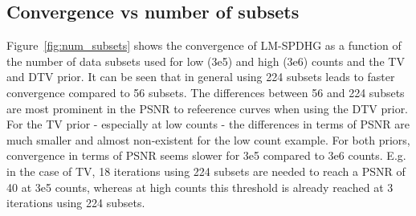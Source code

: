 \subsection*{Convergence vs number of subsets}

Figure~\ref{fig:num_subsets} shows the convergence of LM-SPDHG as a function of the number of data
subsets used for low (3e5) and high (3e6) counts and the TV and DTV prior.
It can be seen that in general using 224 subsets leads to faster convergence compared to 56 subsets.
The differences between 56 and 224 subsets are most prominent in the PSNR to refeerence curves 
when using the DTV prior.
For the TV prior - especially at low counts - the differences in terms of PSNR are much smaller
and almost non-existent for the low count example.
For both priors, convergence in terms of PSNR seems slower for 3e5 compared to 3e6 counts.
E.g. in the case of TV, 18 iterations using 224 subsets are needed to reach a PSNR of 40 at 3e5 counts, 
whereas at high counts this threshold is already reached at 3 iterations using 224 subsets.


